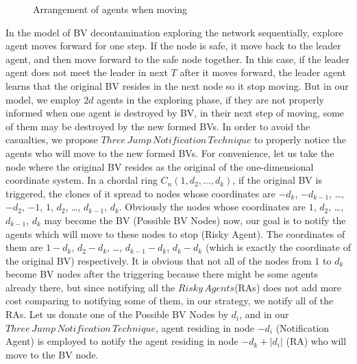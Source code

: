 \begin{figure} [H]
  \centering 
  \hspace{1in} 
  \caption{Arrangement of agents when moving} 
  \label{fig:subfig} %
\end{figure}

In the model of BV decontamination exploring the network sequentially, explore agent moves forward for one step. If the node is safe, it move back to the leader agent, and then move forward to the safe node together. In this case, if the leader agent does not meet the leader in next $T$ after it moves forward, the leader agent learns that the original BV resides in the next node so it stop moving. 
But in our model, we employ $2d$ agents in the exploring phase, if they are not properly informed when one agent is destroyed by BV, in their next step of moving, some of them may be destroyed by the new formed BVs. In order to avoid the casualties, we propose $Three\,Jump\,Notification\,Technique$ to properly notice the agents who will move to the new formed BVs.
For convenience, let us take the node where the original BV resides as the original of the one-dimensional coordinate system. In a chordal ring $C_n(1, d_2, \ldots,  d_k)$, if the original BV is triggered, the clones of it spread to nodes whose coordinates are $-d_k$, $-d_{k-1}$, \ldots, $-d_2$, $-1$, $1$, $d_2$, \ldots, $d_{k-1}$, $d_k$. Obviously the nodes whose coordinates are $1$, $d_2$, \dots, $d_{k-1}$, $d_k$ may become the BV (Possible BV Nodes) now, our goal is to notify the agents which will move to these nodes to stop (Risky Agent). The coordinates of them are $1- d_k$, $d_2-d_k$, \ldots, $d_{k-1}-d_k$, $d_k-d_k$ (which is exactly the coordinate of the original BV) respectively. It is obvious that not all of the nodes from $1$ to $d_k$ become BV nodes after the triggering because there might be some agents already there, but since notifying all the $Risky\,Agents$(RAs) does not add more cost comparing to notifying some of them, in our strategy, we notify all of the RAs. Let us donate one of the Possible BV Nodes by $d_i$, and in our $ Three\,Jump\,Notification\,Technique$, agent residing in node $-d_i$ (Notification Agent) is employed to notify the agent residing in node $-d_k+\left |d_i\right |$ (RA) who will move to the BV node. 

